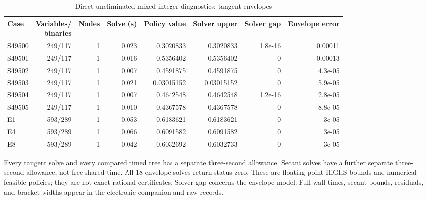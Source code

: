 \begin{table}[p]
\centering\small
\setlength{\tabcolsep}{3.5pt}
\caption{Direct uneliminated mixed-integer diagnostics: tangent envelopes}\label{tab:r51-mip}
\begin{tabular}{lrrrrrrr}
\toprule
Case & \shortstack{Variables/\\binaries} & Nodes & Solve (s) & Policy value & Solver upper & Solver gap & Envelope error \\
\midrule
S49500 & 249/117 & 1 & 0.023 & 0.3020833 & 0.3020833 & 1.8e-16 & 0.00011 \\
S49501 & 249/117 & 1 & 0.016 & 0.5356402 & 0.5356402 & 0 & 0.00013 \\
S49502 & 249/117 & 1 & 0.007 & 0.4591875 & 0.4591875 & 0 & 4.3e-05 \\
S49503 & 249/117 & 1 & 0.021 & 0.03015152 & 0.03015152 & 0 & 5.9e-05 \\
S49504 & 249/117 & 1 & 0.007 & 0.4642548 & 0.4642548 & 1.2e-16 & 2.8e-05 \\
S49505 & 249/117 & 1 & 0.010 & 0.4367578 & 0.4367578 & 0 & 8.8e-05 \\
E1 & 593/289 & 1 & 0.053 & 0.6183621 & 0.6183621 & 0 & 3e-05 \\
E4 & 593/289 & 1 & 0.066 & 0.6091582 & 0.6091582 & 0 & 3e-05 \\
E8 & 593/289 & 1 & 0.042 & 0.6032692 & 0.6032733 & 0 & 3e-05 \\
\bottomrule
\end{tabular}
\par\smallskip\begin{minipage}{\textwidth}\footnotesize Every tangent solve and every compared timed tree has a separate three-second allowance. Secant solves have a further separate three-second allowance, not free shared time. All 18 envelope solves return status zero. These are floating-point HiGHS bounds and numerical feasible policies; they are not exact rational certificates. Solver gap concerns the envelope model. Full wall times, secant bounds, residuals, and bracket widths appear in the electronic companion and raw records.\end{minipage}
\end{table}

